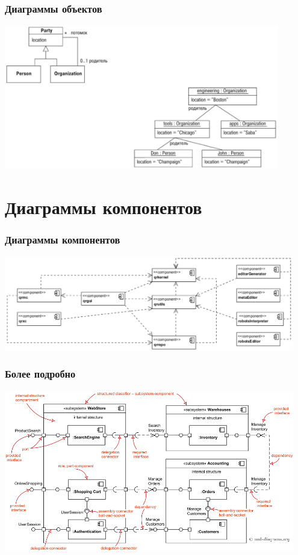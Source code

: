 \documentclass{../mcsslides}
\begin{document}
    \begin{frame}
        \frametitle{Диаграммы объектов}
        \begin{center}
            \includegraphics[width=0.9\textwidth]{objectDiagrams.png}
        \end{center}
    \end{frame}

    \section{Диаграммы компонентов}
    
    \begin{frame}
        \frametitle{Диаграммы компонентов}
        \begin{center}
            \includegraphics[width=0.95\textwidth]{componentDiagrams.png}
        \end{center}
    \end{frame}

    \begin{frame}
        \frametitle{Более подробно}
        \begin{center}
            \includegraphics[width=0.95\textwidth]{componentDiagramsOverview.png}
        \end{center}
    \end{frame}
\end{document}
